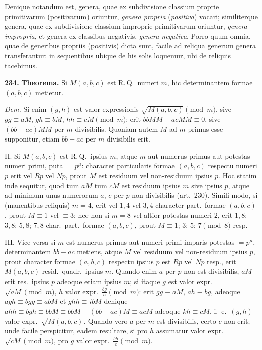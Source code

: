 \documentclass[12pt,a4paper]{article}
\theoremstyle{plain}
\theoremstyle{definition}
\theoremstyle{remark}
\begin{document}
Denique notandum est, genera, quae ex subdivisione classium proprie primitivarum (positivarum) oriuntur, \emph{genera propria} (\emph{positiva}) vocari; similiterque genera, quae ex subdivisione classium improprie primitivarum oriuntur, \emph{genera impropria}, et genera ex classibus negativis, \emph{genera negativa}. Porro quum omnia, quae de generibus propriis (positivis) dicta sunt, facile ad reliqua generum genera transferantur: in sequentibus ubique de his solis loquemur, ubi de reliquis tacebimus.

\textbf{234.}
\textbf{Theorema.}
Si $M(a,b,c)$ est R.\,Q.\ numeri $m$, hic determinantem formae $(a,b,c)$ metietur.

\textit{Dem.}
Si enim $(g,h)$ est valor expressionis $\sqrt{M(a,b,c)}\pmod{m}$, sive $gg\equiv aM$, $gh\equiv bM$, $hh\equiv cM\pmod{m}$: erit $bbMM-acMM\equiv 0$, sive $(bb-ac)MM$ per $m$ divisibilis. Quoniam autem $M$ ad $m$ primus esse supponitur, etiam $bb-ac$ per $m$ divisibilis erit.

II. Si $M(a,b,c)$ est R.\,Q.\ ipsius $m$, atque $m$ aut numerus primus aut potestas numeri primi, puta $=p^\mu$: character particularis formae $(a,b,c)$ respectu numeri $p$ erit vel $Rp$ vel $Np$, prout $M$ est residuum vel non-residuum ipsius $p$. Hoc statim inde sequitur, quod tum $aM$ tum $cM$ est residuum ipsius $m$ sive ipsius $p$, atque ad minimum unus numerorum $a$, $c$ per $p$ non divisibilis (art.\ 230). Simili modo, si (manentibus reliquis) $m=4$, erit vel $1,4$ vel $3,4$ character part.\ formae $(a,b,c)$, prout $M\equiv 1$ vel $\equiv 3$; nec non si $m=8$ vel altior potestas numeri $2$, erit $1,8$; $3,8$; $5,8$; $7,8$ char.\ part.\ formae $(a,b,c)$, prout $M\equiv 1$; $3$; $5$; $7\pmod{8}$ resp.

III. Vice versa si $m$ est numerus primus aut numeri primi imparis potestas $=p^\mu$, determinantem $bb-ac$ metiens, atque $M$ vel residuum vel non-residuum ipsius $p$, prout character formae $(a,b,c)$ respectu ipsius $p$ est $Rp$ vel $Np$ resp., erit $M(a,b,c)$ resid.\ quadr.\ ipsius $m$. Quando enim $a$ per $p$ non est divisibilis, $aM$ erit res.\ ipsius $p$ adeoque etiam ipsius $m$; si itaque $g$ est valor expr.\ $\sqrt{aM}\pmod{m}$, $h$ valor expr.\ $\frac{bg}{a}\pmod{m}$: erit $gg\equiv aM$, $ah\equiv bg$, adeoque $agh\equiv bgg\equiv abM$ et $ghh\equiv ibM$ denique $ahh\equiv bgh\equiv bbM\equiv bbM-(bb-ac)M\equiv acM$ adeoque $kh\equiv cM$, i.\ e.\ $(g,h)$ valor expr.\ $\sqrt{M(a,b,c)}$. Quando vero $a$ per $m$ est divisibilis, certo $c$ non erit; unde facile perspicitur, eadem resultare, si pro $h$ assumatur valor expr.\ $\sqrt{cM}\pmod{m}$, pro $g$ valor expr.\ $\frac{bh}{c}\pmod{m}$.
\end{document}
